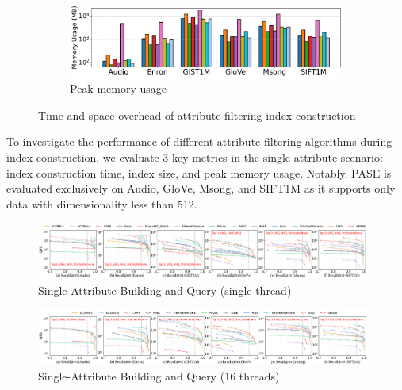 \documentclass[sigconf, nonacm]{acmart}
\begin{document}
\begin{figure}[t]
		
		
		\begin{subfigure}{\columnwidth}
			\centering
			\setlength{\abovecaptionskip}{0cm}
			\setlength{\belowcaptionskip}{-0.3cm}
			\includegraphics[width=0.95\linewidth]{figures/indexData/exp_7_memory_mb_comparison_query1.pdf}
			\caption{Peak memory usage}
			\label{fig:memory_mb_comparison_query1}
		\end{subfigure}
		
		\caption{Time and space overhead of attribute filtering index construction}
		\label{fig:build_index_comparison}
	\end{figure}
	
	
	
	To investigate the performance of different attribute filtering algorithms during index construction, we evaluate 3 key metrics in the single-attribute scenario: index construction time, index size, and peak memory usage. Notably, PASE is evaluated exclusively on Audio, GloVe, Msong, and SIFT1M as it supports only data with dimensionality less than 512.
	
	\begin{figure}
		\centering
		        \setlength{\abovecaptionskip}{0cm}
		    \setlength{\belowcaptionskip}{-0.5cm}
		\includegraphics[width=0.98\textwidth]{figures/exp/exp_1_1_SingleLabel_1thread.pdf}
		\caption{Single-Attribute Building and Query (single thread) }
		\label{fig:exp_1_1_SingleLabel_1thread}
	\end{figure}
	
	\begin{figure}
		\centering
		    \setlength{\abovecaptionskip}{0cm}
		    \setlength{\belowcaptionskip}{-0.5cm}
		\includegraphics[width=0.98\textwidth]{figures/exp/exp_1_2_SingleLabel_16thread.pdf}
		\caption{Single-Attribute Building and Query (16 threads)}
		\label{fig:exp_1_2_SingleLabel_16thread}
	\end{figure}
	
\end{document}
